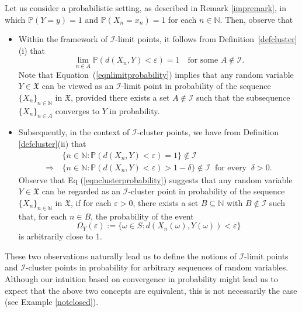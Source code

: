 \documentclass[reqno]{amsart}
\begin{document}
\begin{remark}

Let us consider a probabilistic setting, as described in Remark \ref{impremark}, in which $\mathbb{P}(Y = y) = 1$ and $\mathbb{P}(X_n = x_n) = 1$ for each $n \in \mathbb{N}$. Then, observe that 
\begin{itemize}
\item[(a)] Within the framework of $\mathcal{I}$-limit points, it follows from Definition~\ref{defcluster}(i) that  
\begin{equation}\label{eqnlimitprobability}
	\lim_{n \in A} \mathbb{P}(d(X_n, Y) < \varepsilon) = 1 \quad \text{for some } A \notin \mathcal{I}.
\end{equation}
Note that Equation~(\ref{eqnlimitprobability}) implies that any random variable $Y \in \mathfrak{X}$ can be viewed as an $\mathcal{I}$-limit point in probability of the sequence $\{X_n\}_{n \in \mathbb{N}}$ in $\mathfrak{X}$, provided there exists a set $A \notin \mathcal{I}$ such that the subsequence $\{X_n\}_{n \in A}$ converges to $Y$ in probability.
\item[(b)] Subsequently, in the context of
$\mathcal{I}$-cluster points, we have from Definition \ref{defcluster}(ii)  that 
\begin{align}\label{eqnclusterprobability}
	&\{n \in \mathbb{N} : \mathbb{P}(d(X_n, Y) < \varepsilon) = 1\} \notin \mathcal{I}\nonumber\\
	\Rightarrow ~&\{n \in \mathbb{N} : \mathbb{P}(d(X_n, Y) < \varepsilon)> 1-\delta\} \notin \mathcal{I}~\mbox{ for every }~\delta>0. 
\end{align}
Observe that Eq (\ref{eqnclusterprobability}) suggests that any random variable $Y \in \mathfrak{X}$  can be regarded as an $\mathcal{I}$-cluster point in probability of the sequence $\{X_n\}_{n\in\mathbb{N}}$ in $\mathfrak{X}$, if for each $\varepsilon>0$, there exists a set $B \subseteq \mathbb{N}$ with $B \notin \mathcal{I}$ such that, for each $n \in B$, the probability of the event 
$$
\Omega_Y(\varepsilon):= \{\omega \in S : d(X_n(\omega), Y(\omega)) < \varepsilon\}
$$
is arbitrarily close to 1. 
\end{itemize}


These two observations naturally lead  us to define the notions of $\mathcal{I}$-limit points and $\mathcal{I}$-cluster points in probability for arbitrary sequences of random variables. Although our intuition based on convergence in probability might lead us to expect that the above two concepts are equivalent, this is not necessarily the case (see Example \ref{notclosed}).




\end{remark}
\end{document}
